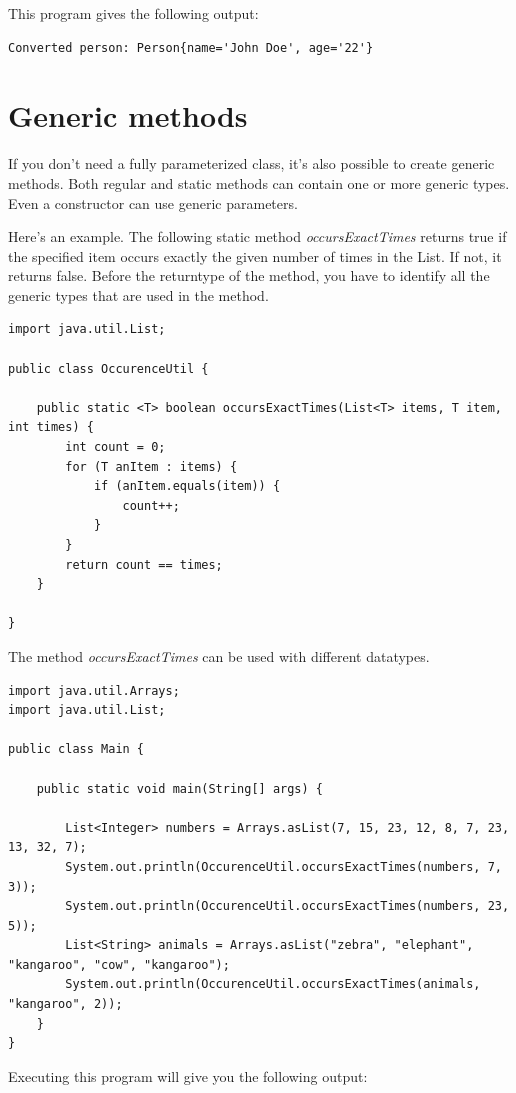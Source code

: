 This program gives the following output:
\begin{verbatim}
Converted person: Person{name='John Doe', age='22'}
\end{verbatim}


\section{Generic methods}

If you don't need a fully parameterized class, it's also possible to create generic methods. Both regular and static methods can contain one or more generic types. Even a constructor can use generic parameters.

Here's an example.
The following static method \textit{occursExactTimes} returns true if the specified item occurs exactly the given number of times in the List. If not, it returns false.
Before the returntype of the method, you have to identify all the generic types that are used in the method.
 
\begin{lstlisting}
import java.util.List;

public class OccurenceUtil {

	public static <T> boolean occursExactTimes(List<T> items, T item, int times) {
		int count = 0;
		for (T anItem : items) {
			if (anItem.equals(item)) {
				count++;
			}
		}
		return count == times;
	}

}
\end{lstlisting}

The method \textit{occursExactTimes} can be used with different datatypes. 

\begin{lstlisting}
import java.util.Arrays;
import java.util.List;

public class Main {

	public static void main(String[] args) {

		List<Integer> numbers = Arrays.asList(7, 15, 23, 12, 8, 7, 23, 13, 32, 7);
		System.out.println(OccurenceUtil.occursExactTimes(numbers, 7, 3));
		System.out.println(OccurenceUtil.occursExactTimes(numbers, 23, 5));
		List<String> animals = Arrays.asList("zebra", "elephant", "kangaroo", "cow", "kangaroo");
		System.out.println(OccurenceUtil.occursExactTimes(animals, "kangaroo", 2));
	}
}
\end{lstlisting}

Executing this program will give you the following output:

